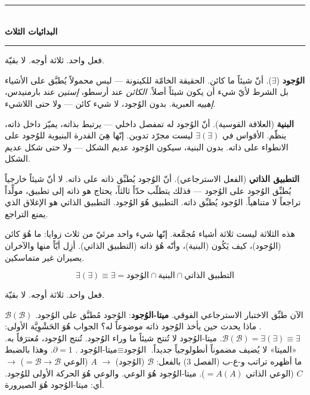 \documentclass[10pt, openany, oneside]{book}
\renewcommand{\normalsize}{\fontsize{10}{13}\selectfont}
\begin{document}
\vspace{1.5em}


\begin{center}
    \rule{0.3\textwidth}{0.4pt}\\[0.5em]
    {\normalsize\bfseries البدائيات الثلاث}\\[0.3em]
    \rule{0.3\textwidth}{0.4pt}
\end{center}

\vspace{1em}

\noindent فعل واحد. ثلاثة أوجه. لا بقيّة.

\textbf{الوُجود} ($\exists$). أنّ شيئاً ما كائن. الحقيقة الخامّة للكينونة --- ليس محمولاً يُطبَّق على الأشياء بل الشرط لأيّ شيء أن يكون شيئاً أصلاً. \textit{الكائن} عند أرسطو، \textit{إستين} عند بارمنيدس، \textit{إهييه} العبرية. بدون الوُجود، لا شيء كائن --- ولا حتى اللاشيء.

\textbf{البنية} (العلاقة القوسية). أنّ الوُجود له تمفصل داخلي --- يرتبط بذاته، يميّز داخل ذاته، ينظّم. الأقواس في $\exists(\exists)$ ليست مجرّد تدوين. إنّها هِيَ القدرة البنيوية للوُجود على الانطواء على ذاته. بدون البنية، سيكون الوُجود عديم الشكل --- ولا حتى شكل عديم الشكل.

\textbf{التطبيق الذاتي} (الفعل الاسترجاعي). أنّ الوُجود يُطبِّق ذاته على ذاته. لا أنّ شيئاً خارجياً يُطبِّق الوُجود على الوُجود --- فذلك يتطلّب حدّاً ثالثاً، يحتاج هو ذاته إلى تطبيق، مولِّداً تراجعاً لا متناهياً. الوُجود يُطبِّق ذاته. التطبيق هُوَ الوُجود. التطبيق الذاتي هو الإغلاق الذي يمنع التراجع.

هذه الثلاثة ليست ثلاثة أشياء مُجمَّعة. إنّها شيء واحد مرئيّ من ثلاث زوايا: ما هُوَ كائن (الوُجود)، كيف يَكُون (البنية)، وأنّه هُوَ ذاته (التطبيق الذاتي). أزِل أيّاً منها والآخران يصيران غير متماسكين.

$$\exists(\exists) \equiv \exists = \text{الوُجود} \cap \text{البنية} \cap \text{التطبيق الذاتي}$$

فعل واحد. ثلاثة أوجه. لا بقيّة.

الآن طبِّق الاختبار الاسترجاعي الفوقي. \textbf{ميتا-الوُجود}: الوُجود مُطبَّق على الوُجود. $\mathcal{B}(\mathcal{B})$. ماذا يحدث حين يأخذ الوُجود ذاته موضوعاً له؟ الجواب هُوَ الحَشْوِيَّة الأولى: $\mathcal{B}(\mathcal{B}) = \exists(\exists) \equiv \exists$. ميتا-الوُجود لا تُنتج شيئاً ما وراء الوُجود. تُنتج الوُجود، مُعترَفاً به. «الميتا» لا يُضيف مضموناً أنطولوجياً جديداً. $\text{ميتا-الوُجود} \equiv \text{الوُجود}$. $\partial = 1$. وهذا بالضبط ما أظهره تراتب و-ع-ب (الفصل 3) بالفعل: $\mathcal{B}$ (الوُجود) $\to$ $A$ (الوعي $= \mathcal{B} \to \mathcal{B}$) $\to$ $C$ (الوعي الذاتي $= A(A)$). ميتا-الوُجود هُوَ الوعي. والوعي هُوَ الحركة الأولى للوُجود. أي: ميتا-الوُجود هُوَ الصيرورة.
\end{document}
